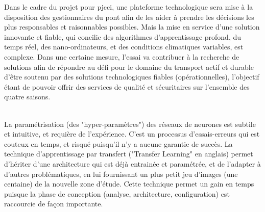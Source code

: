 ﻿\noindent Dans le cadre du projet pour \acrshort{pjcci}, une plateforme technologique sera mise à la disposition des gestionnaires du pont afin de les aider à prendre les décisions les plus responsables et raisonnables possibles. Mais la mise en service d'une solution innovante et fiable, qui concilie des algorithmes d'apprentissage profond, du temps réel, des nano-ordinateurs, et des conditions climatiques variables, est complexe. Dans une certaine mesure, l'essai va contribuer à la recherche de solutions afin de répondre au défi pour le domaine du transport actif et durable d'être soutenu par des solutions technologiques fiables (opérationnelles), l'objectif étant de pouvoir offrir des services de qualité et sécuritaires sur l'ensemble des quatre saisons.
\begin{comment}
\vspace{\baselineskip}
\\
\noindent Il est difficile de trouver des jeux de données pour entrainer les réseaux de neurones pleinement connectés (\acrshort{fcn}) adaptés à la problématique. La technique de transfert d'apprentissage permet de démarrer d'une architecture qui a déjà appris avec un jeu d'images important (milliers d'images), et de lui faire apprendre davantage, en lui fournissant un plus petit jeu d'images (centaines d'images) de la nouvelle zone d'étude. Par exemple une architecture peut avoir appris à classifier des images de la Californie, aux États-Unis. Pour lui permettre de classifier des images de la Ville de Sherbrooke, il est souhaitable de lui fournir un nouveau jeu de données spécifique à cette ville afin qu'il s'adapte (ses paramètres) à cette région. Dans le contexte de cet essai, cela se traduit par réentrainer différents modèles avec des images de la piste multifonctionnelle du pont Jacques-Cartier.
\end{comment}
\vspace{\baselineskip}
\\
\noindent La paramétrisation (des "hyper-paramètres") des réseaux de neurones est subtile et intuitive, et requière de l'expérience. C'est un processus d'essais-erreurs qui est couteux en temps, et risqué puisqu'il n'y a aucune garantie de succès. La technique d'apprentissage par transfert ("Transfer Learning" en anglais) permet d'hériter d'une architecture qui est déjà entrainée et paramétrée, et de l'adapter à d'autres problématiques, en lui fournissant un plus petit jeu d'images (une centaine) de la nouvelle zone d'étude. Cette technique permet un gain en temps puisque la phase de conception (analyse, architecture, configuration) est raccourcie de façon importante.
